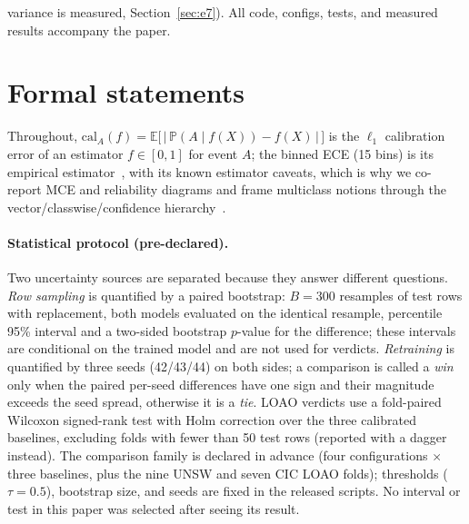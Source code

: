 \documentclass[sigconf,anonymous=false]{acmart}
\begin{document}
variance is measured, Section~\ref{sec:e7}). All code, configs, tests, and measured results accompany the paper.

\appendix
\section{Formal statements}
\label{app:formal}

Throughout, $\mathrm{cal}_A(f) = \mathbb{E}\big[\,|\,\mathbb{P}(A \mid f(X)) - f(X)\,|\,\big]$ is the $\ell_1$ calibration error of an estimator $f\in[0,1]$ for event $A$; the binned ECE (15 bins) is its empirical estimator~\cite{kumar2019}, with its known estimator caveats, which is why we co-report MCE and reliability diagrams and frame multiclass notions through the vector/classwise/confidence hierarchy~\cite{vaicenavicius2019}.

\paragraph{Statistical protocol (pre-declared).} Two uncertainty sources are separated because they answer different questions. \emph{Row sampling} is quantified by a paired bootstrap: $B{=}300$ resamples of test rows with replacement, both models evaluated on the identical resample, percentile 95\% interval and a two-sided bootstrap $p$-value for the difference; these intervals are conditional on the trained model and are not used for verdicts. \emph{Retraining} is quantified by three seeds (42/43/44) on both sides; a comparison is called a \emph{win} only when the paired per-seed differences have one sign and their magnitude exceeds the seed spread, otherwise it is a \emph{tie}. LOAO verdicts use a fold-paired Wilcoxon signed-rank test with Holm correction over the three calibrated baselines, excluding folds with fewer than 50 test rows (reported with a dagger instead). The comparison family is declared in advance (four configurations $\times$ three baselines, plus the nine UNSW and seven CIC LOAO folds); thresholds ($\tau{=}0.5$), bootstrap size, and seeds are fixed in the released scripts. No interval or test in this paper was selected after seeing its result.
\end{document}
